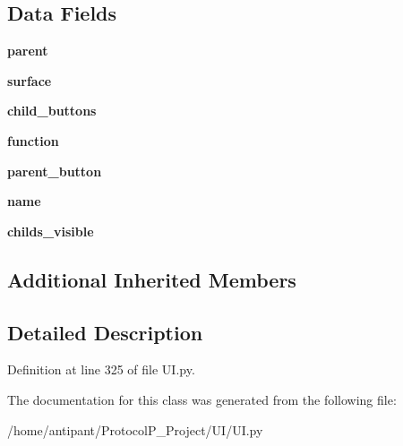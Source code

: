 \subsection*{Data Fields}
\begin{DoxyCompactItemize}
\item 
\hypertarget{classUI_1_1CascadeButton_ae06b29cead7a042f08a0262c7483680d}{{\bfseries parent}}\label{classUI_1_1CascadeButton_ae06b29cead7a042f08a0262c7483680d}

\item 
\hypertarget{classUI_1_1CascadeButton_a8906015ffd34eccc9a6c36badc491f13}{{\bfseries surface}}\label{classUI_1_1CascadeButton_a8906015ffd34eccc9a6c36badc491f13}

\item 
\hypertarget{classUI_1_1CascadeButton_aaf5d97877f96a4861f8cd22e655a93a1}{{\bfseries child\-\_\-buttons}}\label{classUI_1_1CascadeButton_aaf5d97877f96a4861f8cd22e655a93a1}

\item 
\hypertarget{classUI_1_1CascadeButton_a10390bcc6010c66da22e58b2ff5f6cae}{{\bfseries function}}\label{classUI_1_1CascadeButton_a10390bcc6010c66da22e58b2ff5f6cae}

\item 
\hypertarget{classUI_1_1CascadeButton_a7bb5bac8ce7670cf9e9d32f8a75c2fa1}{{\bfseries parent\-\_\-button}}\label{classUI_1_1CascadeButton_a7bb5bac8ce7670cf9e9d32f8a75c2fa1}

\item 
\hypertarget{classUI_1_1CascadeButton_a70230155e3d64cfda15110684e17308f}{{\bfseries name}}\label{classUI_1_1CascadeButton_a70230155e3d64cfda15110684e17308f}

\item 
\hypertarget{classUI_1_1CascadeButton_a3c834a67429959d420e20e32326b3287}{{\bfseries childs\-\_\-visible}}\label{classUI_1_1CascadeButton_a3c834a67429959d420e20e32326b3287}

\end{DoxyCompactItemize}
\subsection*{Additional Inherited Members}


\subsection{Detailed Description}


Definition at line 325 of file U\-I.\-py.



The documentation for this class was generated from the following file\-:\begin{DoxyCompactItemize}
\item 
/home/antipant/\-Protocol\-P\-\_\-\-Project/\-U\-I/U\-I.\-py\end{DoxyCompactItemize}
